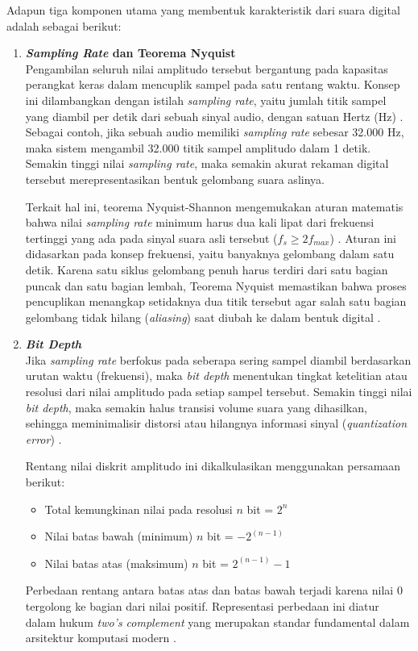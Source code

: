 Adapun tiga komponen utama yang membentuk karakteristik dari suara digital adalah sebagai berikut:
\begin{enumerate}
    \item \textbf{\textit{Sampling Rate} dan Teorema Nyquist} \\
    Pengambilan seluruh nilai amplitudo tersebut bergantung pada kapasitas perangkat keras dalam mencuplik sampel pada satu rentang waktu.
		Konsep ini dilambangkan dengan istilah \textit{sampling rate}, yaitu jumlah titik sampel yang diambil per detik dari sebuah sinyal audio, dengan satuan Hertz (Hz) \cite{oppenheim2010discrete}.
		Sebagai contoh, jika sebuah audio memiliki \textit{sampling rate} sebesar 32.000 Hz, maka sistem mengambil 32.000 titik sampel amplitudo dalam 1 detik.
		Semakin tinggi nilai \textit{sampling rate}, maka semakin akurat rekaman digital tersebut merepresentasikan bentuk gelombang suara aslinya. \par
    
		Terkait hal ini, teorema Nyquist-Shannon mengemukakan aturan matematis bahwa nilai \textit{sampling rate} minimum harus dua kali lipat dari frekuensi tertinggi yang ada pada sinyal suara asli tersebut ($f_s \geq 2f_{max}$) \cite{oppenheim2010discrete}.
		Aturan ini didasarkan pada konsep frekuensi, yaitu banyaknya gelombang dalam satu detik. 
		Karena satu siklus gelombang penuh harus terdiri dari satu bagian puncak dan satu bagian lembah, Teorema Nyquist memastikan bahwa proses pencuplikan menangkap setidaknya dua titik tersebut agar salah satu bagian gelombang tidak hilang (\textit{aliasing}) saat diubah ke dalam bentuk digital \cite{oppenheim2010discrete}. \par

    \item \textbf{\textit{Bit Depth}} \\
    Jika \textit{sampling rate} berfokus pada seberapa sering sampel diambil berdasarkan urutan waktu (frekuensi), maka \textit{bit depth} menentukan tingkat ketelitian atau resolusi dari nilai amplitudo pada setiap sampel tersebut.
		Semakin tinggi nilai \textit{bit depth}, maka semakin halus transisi volume suara yang dihasilkan, sehingga meminimalisir distorsi atau hilangnya informasi sinyal (\textit{quantization error}) \cite{li2014fundamentals}.
		
		Rentang nilai diskrit amplitudo ini dikalkulasikan menggunakan persamaan berikut:
    \begin{itemize}
			\item Total kemungkinan nilai pada resolusi $n$ bit = $2^n$
			\item Nilai batas bawah (minimum) $n$ bit = $-2^{(n-1)}$
			\item Nilai batas atas (maksimum) $n$ bit = $2^{(n-1)}-1$
		\end{itemize}
		\medskip
		Perbedaan rentang antara batas atas dan batas bawah terjadi karena nilai 0 tergolong ke bagian dari nilai positif.
    Representasi perbedaan ini diatur dalam hukum \textit{two's complement} yang merupakan standar fundamental dalam arsitektur komputasi modern \cite{patterson2013computer}. \par


\end{enumerate}
